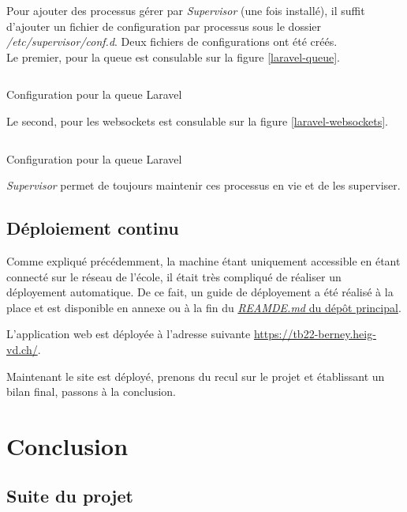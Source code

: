 \documentclass[
    iai, %
    il, %
]{heig-tb}
\begin{document}
Pour ajouter des processus gérer par \emph{Supervisor} (une fois installé), il suffit d'ajouter un fichier de configuration par processus sous le dossier \emph{/etc/supervisor/conf.d}. Deux fichiers de configurations ont été créés. \\
Le premier, pour la queue est consulable sur la figure \ref{laravel-queue}.

\begin{listing}[H]
    \inputminted{text}{assets/code/laravel-queue.conf}
    \caption{Configuration pour la queue Laravel \label{laravel-queue}}
\end{listing}

Le second, pour les \Gls{websockets} est consulable sur la figure \ref{laravel-websockets}.

\begin{listing}[H]
    \inputminted{text}{assets/code/laravel-websockets.conf}
    \caption{Configuration pour la queue Laravel \label{laravel-websockets}}
\end{listing}

\emph{Supervisor} permet de toujours maintenir ces processus en vie et de les superviser.

\section{Déploiement continu}
Comme expliqué précédemment, la machine étant uniquement accessible en étant connecté sur le réseau de l'école, il était très compliqué de réaliser un déployement automatique.
De ce fait, un guide de déployement a été réalisé à la place et est disponible en annexe ou à la fin du \href{https://github.com/heig-fablab/fablab-manager/blob/main/README.md}{\emph{REAMDE.md} du dépôt principal}.

L'application web est déployée à l'adresse suivante \href{https://tb22-berney.heig-vd.ch/}{https://tb22-berney.heig-vd.ch/}.

Maintenant le site est déployé, prenons du recul sur le projet et établissant un bilan final, passons à la conclusion.

\chapter{Conclusion}

\section{Suite du projet}
\end{document}
